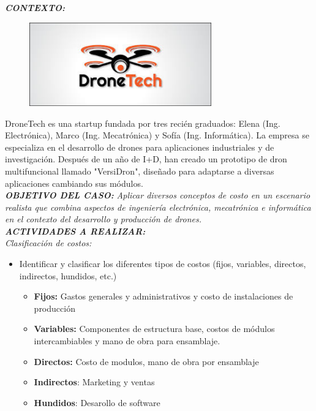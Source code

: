 \documentclass[letterpaper,12pt]{article}
\begin{document}
\begin{sloppypar}
\textbf{\textit{CONTEXTO:}}
\begin{figure}[H]
    \centering 
    \includegraphics[width=0.7\textwidth]{dronetech.png}
\end{figure}
DroneTech es una startup fundada por tres recién graduados: Elena (Ing. Electrónica), Marco (Ing. Mecatrónica) y Sofía (Ing. Informática). La empresa se especializa en el desarrollo de drones para aplicaciones industriales y de investigación. Después de un año de I+D, han creado un prototipo de dron
multifuncional llamado "VersiDron", diseñado para adaptarse a diversas aplicaciones cambiando sus módulos.
\vspace{0.3cm}\\ 
\textbf{\textit{OBJETIVO DEL CASO:}}
\textit{Aplicar diversos conceptos de costo en un escenario realista que combina aspectos de ingeniería electrónica, mecatrónica e informática en el contexto del desarrollo y producción de drones.}
\vspace{0.3cm}\\ 
\textbf{\textit{ACTIVIDADES A REALIZAR:}}
\vspace{0.3cm}\\ 
\textit{Clasificación de costos:}
\begin{itemize}
    \item Identificar y clasificar los diferentes tipos de costos (fijos, variables, directos, indirectos, hundidos, etc.)
    \begin{itemize}
        \item \textbf{Fijos:} Gastos generales y administrativos y costo de instalaciones de producción
        \item \textbf{Variables:} Componentes de estructura base, costos de módulos intercambiables y mano de obra para ensamblaje.
        \item \textbf{Directos:} Costo de modulos, mano de obra por ensamblaje
        \item \textbf{Indirectos}: Marketing y ventas
        \item \textbf{Hundidos}: Desarollo de software

\end{itemize}
\end{itemize}
\end{sloppypar}
\end{document}
